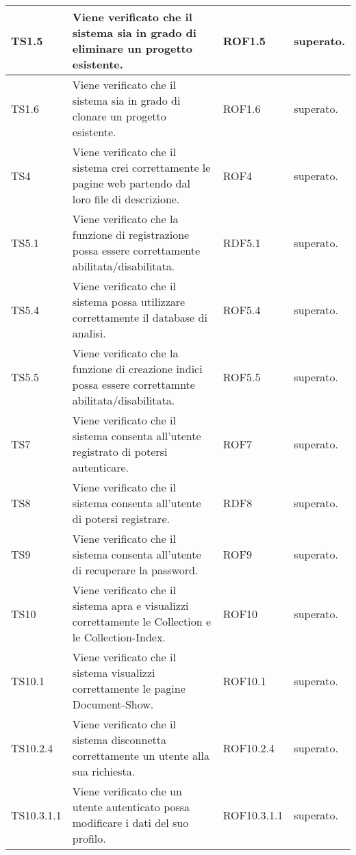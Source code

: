 \begin{center}
\begin{longtable}{|p{2cm}|p{7cm}|p{2cm}|p{2cm}|}
\midrule
TS1.5
& Viene verificato che il sistema sia in grado di eliminare un progetto esistente.
& ROF1.5
& superato.\\


\midrule
TS1.6
& Viene verificato che il sistema sia in grado di clonare un progetto esistente.
& ROF1.6
& superato.\\


\midrule
TS4
& Viene verificato che il sistema crei correttamente le pagine web partendo dal loro file di descrizione.
& ROF4
& superato.\\


\midrule
TS5.1
& Viene verificato che la funzione di registrazione possa essere correttamente abilitata/disabilitata.
& RDF5.1
& superato.\\


\midrule
TS5.4
& Viene verificato che il sistema possa utilizzare correttamente il database di analisi.
& ROF5.4
& superato.\\


\midrule
TS5.5
& Viene verificato che la funzione di creazione indici possa essere correttamnte abilitata/disabilitata.
& ROF5.5
& superato.\\


\midrule
TS7
& Viene verificato che il sistema consenta all'utente registrato di potersi autenticare.
& ROF7
& superato.\\


\midrule
TS8
& Viene verificato che il sistema consenta all'utente di potersi registrare.
& RDF8
& superato.\\


\midrule
TS9
& Viene verificato che il sistema consenta all'utente di recuperare la password.
& ROF9
& superato.\\


\midrule
TS10
& Viene verificato che il sistema apra e visualizzi correttamente le Collection e le Collection-Index.
& ROF10
& superato.\\


\midrule
TS10.1
& Viene verificato che il sistema visualizzi correttamente le pagine Document-Show.
& ROF10.1
& superato.\\


\midrule
TS10.2.4
& Viene verificato che il sistema disconnetta correttamente un utente alla sua richiesta.
& ROF10.2.4
& superato.\\


\midrule
TS10.3.1.1
& Viene verificato che un utente autenticato possa modificare i dati del suo profilo.
& ROF10.3.1.1
& superato.\\



\end{longtable}
\end{center}
